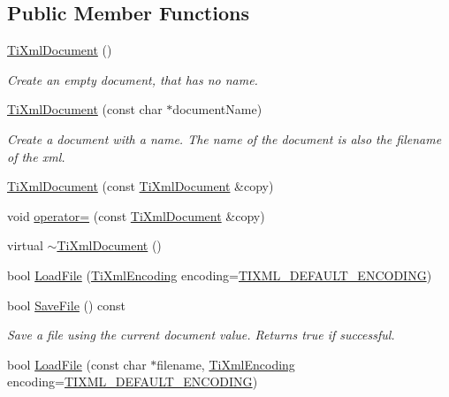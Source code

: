 \subsection*{Public Member Functions}
\begin{DoxyCompactItemize}
\item 
\hyperlink{class_ti_xml_document_a9f5e84335708fde98400230f9f12659c}{TiXmlDocument} ()
\begin{DoxyCompactList}\small\item\em Create an empty document, that has no name. \item\end{DoxyCompactList}\item 
\hyperlink{class_ti_xml_document_ae4508b452d0c3061db085f3db27b8396}{TiXmlDocument} (const char $\ast$documentName)
\begin{DoxyCompactList}\small\item\em Create a document with a name. The name of the document is also the filename of the xml. \item\end{DoxyCompactList}\item 
\hyperlink{class_ti_xml_document_a323a7486e7da6099cdc19a5ff7e74b07}{TiXmlDocument} (const \hyperlink{class_ti_xml_document}{TiXmlDocument} \&copy)
\item 
void \hyperlink{class_ti_xml_document_aafbfacc3414008f619b1345775ef12a4}{operator=} (const \hyperlink{class_ti_xml_document}{TiXmlDocument} \&copy)
\item 
virtual \hyperlink{class_ti_xml_document_a1b8a035c2c2aab38e4387246a0b712c5}{$\sim$TiXmlDocument} ()
\item 
bool \hyperlink{class_ti_xml_document_a4c852a889c02cf251117fd1d9fe1845f}{LoadFile} (\hyperlink{tinyxml_8h_a88d51847a13ee0f4b4d320d03d2c4d96}{TiXmlEncoding} encoding=\hyperlink{tinyxml_8h_ad5b8b092878e9010d6400cb6c13d4879}{TIXML\_\-DEFAULT\_\-ENCODING})
\item 
bool \hyperlink{class_ti_xml_document_a21c0aeb0d0a720169ad4ac89523ebe93}{SaveFile} () const 
\begin{DoxyCompactList}\small\item\em Save a file using the current document value. Returns true if successful. \item\end{DoxyCompactList}\item 
bool \hyperlink{class_ti_xml_document_a879cdf5e981b8b2d2ef82f2546dd28fb}{LoadFile} (const char $\ast$filename, \hyperlink{tinyxml_8h_a88d51847a13ee0f4b4d320d03d2c4d96}{TiXmlEncoding} encoding=\hyperlink{tinyxml_8h_ad5b8b092878e9010d6400cb6c13d4879}{TIXML\_\-DEFAULT\_\-ENCODING})

\end{DoxyCompactItemize}
